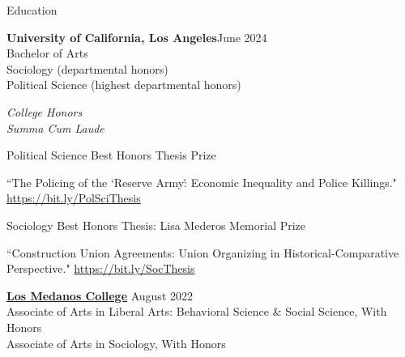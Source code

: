 \documentclass[
	12pt, %
]{resume} %
\begin{document}
\begin{samepage}
\begin{rSection}{Education}
	
    \textbf{University of California, Los Angeles}\hfill June 2024\\
    \hspace*{20pt}Bachelor of Arts\\
    \hspace*{40pt}Sociology (departmental honors) \\
    \hspace*{40pt}Political Science (highest departmental honors)
        
\hspace*{20pt}\textit{College Honors}\\
\hspace*{20pt}\textit{Summa Cum Laude}

\begin{list}{}{\leftmargin=20pt \itemsep=0pt \parsep=0pt}
    \item Political Science Best Honors Thesis Prize
    \begin{list}{}{\leftmargin=20pt \itemsep=0pt \parsep=0pt}
        \item ``The Policing of the `Reserve Army\': Economic Inequality and Police Killings." \href{https://bit.ly/PolSciThesis}{https://bit.ly/PolSciThesis}
    \end{list}
\end{list}

\begin{list}{}{\leftmargin=20pt \itemsep=0pt \parsep=0pt}
    \item Sociology Best Honors Thesis: Lisa Mederos Memorial Prize
    \begin{list}{}{\leftmargin=20pt \itemsep=0pt \parsep=0pt}
        \item ``Construction Union Agreements: Union Organizing in Historical-Comparative Perspective." \href{https://bit.ly/SocThesis}{https://bit.ly/SocThesis}
    \end{list}
\end{list}

\textbf{\href{https://www.losmedanos.edu/}{Los Medanos College}} \hfill August 2022\\ 
\hspace*{20pt}Associate of Arts in Liberal Arts: Behavioral Science \& Social Science, With Honors\\
\hspace*{20pt}Associate of Arts in Sociology, With Honors


\end{rSection}
\end{samepage}
\end{document}
